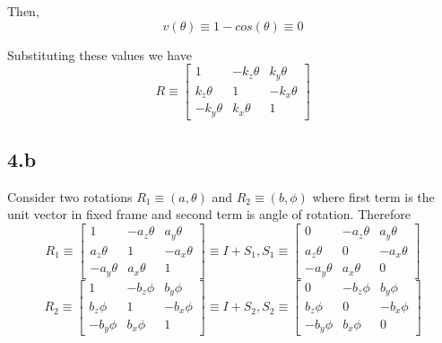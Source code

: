 \documentclass[12pt]{article}
\begin{document}
Then,
\[
  v(\theta) \equiv 1 - cos(\theta) \equiv 0
\]

Substituting these values we have
\[
  R \equiv
  \begin{bmatrix}
    1 & -k_z\theta & k_y\theta\\
     k_z\theta & 1 & -k_x\theta \\
     -k_y\theta & k_x\theta & 1
  \end{bmatrix}
\]

\subsection*{4.b}
Consider two rotations $R_1 \equiv (a, \theta)$ and $R_2 \equiv (b, \phi)$ where first term is the unit vector in fixed frame and second term is angle of rotation.
Therefore
\[
  R_1 \equiv
  \begin{bmatrix}
    1 & -a_z\theta & a_y\theta\\
     a_z\theta & 1 & -a_x\theta \\
     -a_y\theta & a_x\theta & 1
  \end{bmatrix}
  \equiv
  I + S_1
  ,
  S_1 \equiv
  \begin{bmatrix}
    0 & -a_z\theta & a_y\theta\\
     a_z\theta & 0 & -a_x\theta \\
     -a_y\theta & a_x\theta & 0
  \end{bmatrix}
\]
\[
  R_2 \equiv
  \begin{bmatrix}
    1 & -b_z\phi & b_y\phi\\
     b_z\phi & 1 & -b_x\phi \\
     -b_y\phi & b_x\phi & 1
  \end{bmatrix}
  \equiv
  I + S_2
  ,
  S_2 \equiv
  \begin{bmatrix}
    0 & -b_z\phi & b_y\phi\\
     b_z\phi & 0 & -b_x\phi \\
     -b_y\phi & b_x\phi & 0
  \end{bmatrix}
\]
\end{document}
